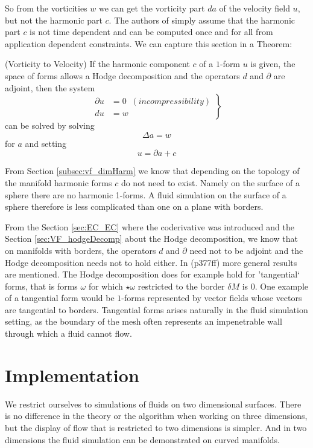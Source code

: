 So from the vorticities $w$ we can get the vorticity part $da$ of the velocity field $u$, but not the harmonic part $c$. The authors of \cite{simplicialFluids} simply assume that the harmonic part $c$ is not time dependent and can be computed once and for all from application dependent constraints. We can capture this section in a Theorem:

\begin{thm} \label{thm:vort2vel}(Vorticity to Velocity) If the harmonic component $c$ of a $1$-form $u$ is given, the space of forms allows a Hodge decomposition and the operators $d$ and $\partial$ are adjoint, then the system
\begin{equation}\left.\begin{aligned}\partial u &= 0 \;\; (incompressibility) \\ 
du &= w \end{aligned}\right\}\end{equation}
can be solved by solving 
\[\Delta a = w\]
for $a$ and setting
\[u = \partial a + c\]
\end{thm}

From Section \ref{subsec:vf_dimHarm} we know that depending on the topology of the manifold harmonic forms $c$ do not need to exist. Namely on the surface of a sphere there are no harmonic 1-forms. A fluid simulation on the surface of a sphere therefore is less complicated than one on a plane with borders. 

From the Section \ref{sec:EC_EC} where the coderivative was introduced and the Section \ref{sec:VF_hodgeDecomp} about the Hodge decomposition, we know that on manifolds with borders, the operators $d$ and $\partial$ need not to be adjoint and the Hodge decomposition needs not to hold either. In \cite{FRANKEL11} (p377ff) more general results are mentioned. The Hodge decomposition does for example hold for 'tangential` forms, that is forms $\omega$ for which $\star\omega$ restricted to the border $\delta M$ is 0. One example of a tangential form would be $1$-forms represented by vector fields whose vectors are tangential to borders. Tangential forms arises naturally in the fluid simulation setting, as the boundary of the mesh often represents an impenetrable wall through which a fluid cannot flow.

\section{Implementation}
We restrict ourselves to simulations of fluids on two dimensional surfaces. There is no difference in the theory or the algorithm when working on three dimensions, but the display of flow that is restricted to two dimensions is simpler. And in two dimensions the fluid simulation can be demonstrated on curved manifolds. 

